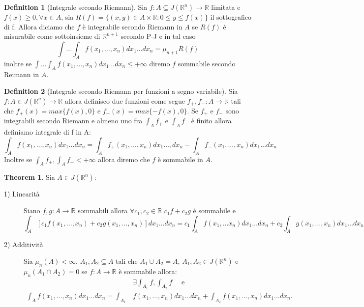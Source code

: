 \documentclass[leqno]{article}
\theoremstyle{definition}
\newtheorem{definition}{Definition}[section]
\numberwithin{equation}{section}
\newtheorem{theorem}{Theorem}[section]
\theoremstyle{remark}
\begin{document}
	\begin{definition}[Integrale secondo Riemann]
		Sia $f:A\subseteq J(\mathbb{R}^n) \rightarrow \mathbb{R}$ limitata e $f(x)\ge 0, \forall x\in A$, sia $R(f)=\{(x,y)\in A\times \mathbb{R}: 0 \le y \le f(x)\} $ il sottografico di f. Allora diciamo che $f$ è integrabile secondo Riemann in $A$ se $R(f)$ è misurabile come sottoinsieme di $\mathbb{R}^{n+1}$ secondo P-J e in tal caso 
		\begin{equation}
			\int \dots \int_A f(x_1,\dots ,x_n)dx_1\dots dx_n=\mu_{n+1}R(f)
		\end{equation}
		inoltre se $\int \dots \int_A f(x_1,\dots ,x_n)dx_1\dots dx_n\le + \infty$ diremo $f$ sommabile secondo Reimann in $A$.
	\end{definition}
	\begin{definition}[Integrale secondo Riemann per funzioni a segno variabile]
		Sia $f:A\in J(\mathbb{R}^n) \rightarrow \mathbb{R}$ allora definisco due funzioni come segue $f_+,f_-:A\rightarrow \mathbb{R}$ tali che $f_+(x)=max\{f(x),0\}$ e $f_-(x)=max\{-f(x),0\}$. Se $f_+$ e $f_-$ sono integrabili secondo Riemann e almeno uno fra $\int_A f_+$ e $\int_A f_-$ è finito allora definiamo integrale di f in A:
		\begin{equation}
			\int_Af(x_1,\dots , x_n)dx_1\dots dx_n=\int_Af_+(x_1,\dots ,x_n)dx_1\dots , dx_n-\int_Af_-(x_1,\dots ,x_n)dx_1\dots dx_n
		\end{equation}
		Inoltre se $\int_A f_+,\int_A f_-<+\infty$ allora diremo che $f$ è sommabile in $A$.
	\end{definition}
	\begin{theorem}
		Sia $A\in J(\mathbb{R}^n)$:
		\begin{description}
			\item[1) Linearità] Siano $f,g:A\to \mathbb{R}$ sommabili allora $\forall c_1,c_2 \in \mathbb{R}$ $c_1f+c_2g$ è sommabile e 
			\begin{equation}
				\int_A[c_1f(x_1,\dots ,x_n)+c_2g(x_1,\dots ,x_n)]dx_1\dots dx_n= c_1\int_Af(x_1, \dots x_n)dx_1 \dots dx_n+c_2\int_Ag(x_1,\dots ,x_n)dx_1 \dots dx_n
			\end{equation}   
			\item[2) Additività] Sia $\mu_n(A)<\infty$, $A_1,A_2\subseteq A$ tali che $A_1\cup A_2=A, \, A_1,A_2\in J(\mathbb{R}^n)$ e $\mu_n(A_1\cap A_2)=0$ se $f:A\to \mathbb{R}$ è sommabile allora: 
			\begin{align*}
				&\exists \int_{A_1}f, \int_{A_2}f \quad \text{ e}\\
				\int_Af(x_1,\dots ,x_n)dx_1\dots dx_n=\int_{A_1} &f(x_1,\dots ,x_n)dx_1\dots dx_n+\int_{A_2}f(x_1,\dots ,x_n)dx_1\dots dx_n.
			\end{align*}
		\end{description}
	\end{theorem}
\end{document}
